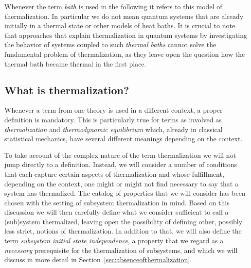 \documentclass[a4paper,12pt,listof=totoc,index=totoc,bibliography=totoc,headsepline=false,headings=normal,BCOR16.153846mm,DIV12,headinclude,twoside,cleardoublepage=empty,numbers=noenddot,final]{scrreprt}
\theoremstyle{mystyle}
\numberwithin{equation}{section}
\numberwithin{figure}{section}
\numberwithin{lemma}{section}
\numberwithin{theorem}{section}
\numberwithin{corollary}{section}
\numberwithin{definition}{section}
\numberwithin{conjecture}{section}
\numberwithin{observation}{section}
\newcommand{\+}{\mkern2mu}
\DeclareMathOperator{\1}{\mathds{1}}
\begin{document}
Whenever the term \emph{bath} is used in the following it refers to this model of thermalization.
In particular we do not mean quantum systems that are already initially in a thermal state or other models of heat baths.
It is crucial to note that approaches that explain thermalization in quantum systems by investigating the behavior of systems coupled to such \emph{thermal baths} cannot solve the fundamental problem of thermalization, as they leave open the question how the thermal bath became thermal in the first place.

\vspace{2em}%
\subsection{What is thermalization?}
\label{sec:whatisthermalization}
%
Whenever a term from one theory is used in a different context, a proper definition is mandatory.
This is particularly true for terms as involved as \emph{thermalization} and \emph{thermodynamic equilibrium} which, already in classical statistical mechanics, have several different meanings depending on the context.

To take account of the complex nature of the term thermalization we will not jump directly to a definition.
Instead, we will consider a number of conditions that each capture certain aspects of thermalization and whose fulfillment, depending on the context, one might or might not find necessary to say that a system has thermalized.
The catalog of properties that we will consider has been chosen with the setting of subsystem thermalization in mind.
Based on this discussion we will then carefully define what we consider sufficient to call a (sub)system thermalized, leaving open the possibility of defining other, possibly less strict, notions of thermalization.
In addition to that, we will also define the term \emph{subsystem initial state independence}, a property that we regard as a \emph{necessary} prerequisite for the thermalization of subsystems, and which we will discuss in more detail in Section~\ref{sec:absenceofthermalization}.

\end{document}
